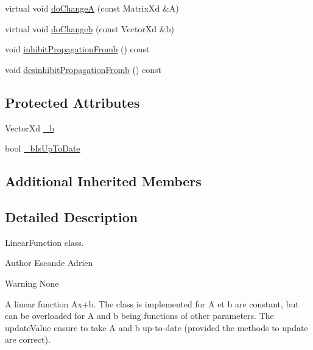 {\bf }\par
\begin{DoxyCompactItemize}
\item 
virtual void \hyperlink{classocra_1_1LinearFunction_ab573c2f615d2edefb647979d3cc3cf46}{do\+ChangeA} (const Matrix\+Xd \&A)
\item 
virtual void \hyperlink{classocra_1_1LinearFunction_ad6003a64fd49102599620206ca161345}{do\+Changeb} (const Vector\+Xd \&b)
\end{DoxyCompactItemize}

{\bf }\par
\begin{DoxyCompactItemize}
\item 
void \hyperlink{classocra_1_1LinearFunction_a08b286c3cdc1ab8407ba7a9ce9eba8c7}{inhibit\+Propagation\+Fromb} () const
\item 
void \hyperlink{classocra_1_1LinearFunction_ace93b1e909f57e1a49faa37041916c7c}{desinhibit\+Propagation\+Fromb} () const
\end{DoxyCompactItemize}

\subsection*{Protected Attributes}
\begin{DoxyCompactItemize}
\item 
Vector\+Xd \hyperlink{classocra_1_1LinearFunction_ab556d7683de415e8273bdbf955f7da02}{\+\_\+b}
\item 
bool \hyperlink{classocra_1_1LinearFunction_a97de5274c98711b37b04aed99c237ce6}{\+\_\+b\+Is\+Up\+To\+Date}
\end{DoxyCompactItemize}
\subsection*{Additional Inherited Members}


\subsection{Detailed Description}
Linear\+Function class. 

\begin{DoxyAuthor}{Author}
Escande Adrien 
\end{DoxyAuthor}
\begin{DoxyWarning}{Warning}
None
\end{DoxyWarning}
A linear function Ax+b. The class is implemented for A et b are constant, but can be overloaded for A and b being functions of other parameters. The update\+Value ensure to take A and b up-\/to-\/date (provided the methods to update are correct). 


